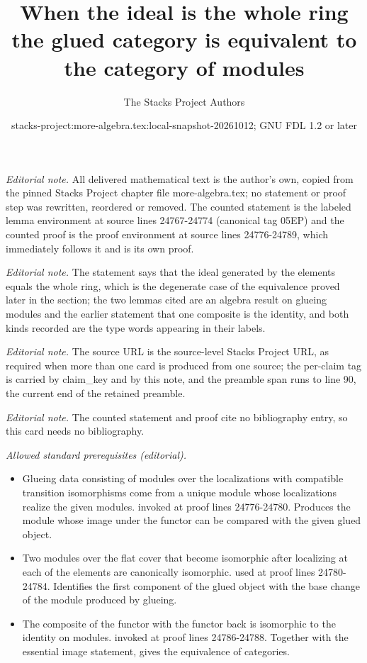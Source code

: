 \documentclass[10pt,a4paper]{amsart}
\title{When the ideal is the whole ring the glued category is equivalent to the category of modules}
\author{The Stacks Project Authors}
\date{stacks-project:more-algebra.tex:local-snapshot-20261012; GNU FDL 1.2 or later}
\theoremstyle{plain}
\theoremstyle{definition}
\theoremstyle{remark}
\numberwithin{equation}{subsection}
\begin{document}
\maketitle
\setcounter{subsection}{1}
\noindent\textit{Editorial note.} All delivered mathematical text is the author's own, copied from the pinned Stacks Project chapter file more-algebra.tex; no statement or proof step was rewritten, reordered or removed. The counted statement is the labeled lemma environment at source lines 24767-24774 (canonical tag 05EP) and the counted proof is the proof environment at source lines 24776-24789, which immediately follows it and is its own proof.\par\medskip
\noindent\textit{Editorial note.} The statement says that the ideal generated by the elements equals the whole ring, which is the degenerate case of the equivalence proved later in the section; the two lemmas cited are an algebra result on glueing modules and the earlier statement that one composite is the identity, and both kinds recorded are the type words appearing in their labels.\par\medskip
\noindent\textit{Editorial note.} The source URL is the source-level Stacks Project URL, as required when more than one card is produced from one source; the per-claim tag is carried by claim\_key and by this note, and the preamble span runs to line 90, the current end of the retained preamble.\par\medskip
\noindent\textit{Editorial note.} The counted statement and proof cite no bibliography entry, so this card needs no bibliography.\par\medskip
\noindent\textit{Allowed standard prerequisites (editorial).}\begin{itemize}
\item Glueing data consisting of modules over the localizations with compatible transition isomorphisms come from a unique module whose localizations realize the given modules. invoked at proof lines 24776-24780. Produces the module whose image under the functor can be compared with the given glued object.
\item Two modules over the flat cover that become isomorphic after localizing at each of the elements are canonically isomorphic. used at proof lines 24780-24784. Identifies the first component of the glued object with the base change of the module produced by glueing.
\item The composite of the functor with the functor back is isomorphic to the identity on modules. invoked at proof lines 24786-24788. Together with the essential image statement, gives the equivalence of categories.
\end{itemize}\medskip
\end{document}
